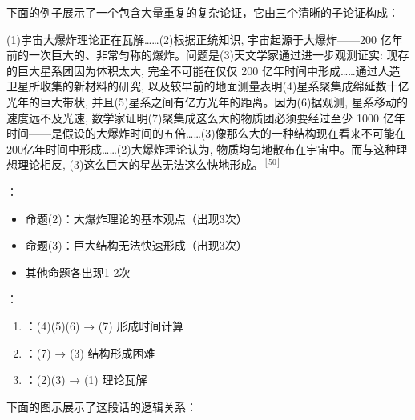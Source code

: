 下面的例子展示了一个包含大量重复的复杂论证，它由三个清晰的子论证构成：

\begin{displayquote}
(1)宇宙大爆炸理论正在瓦解……(2)根据正统知识, 宇宙起源于大爆炸——200 亿年前的一次巨大的、非常匀称的爆炸。问题是(3)天文学家通过进一步观测证实: 现存的巨大星系团因为体积太大, 完全不可能在仅仅 200 亿年时间中形成……通过人造卫星所收集的新材料的研究, 以及较早前的地面测量表明(4)星系聚集成绵延数十亿光年的巨大带状, 并且(5)星系之间有亿方光年的距离。因为(6)据观测, 星系移动的速度远不及光速, 数学家证明(7)聚集成这么大的物质团必须要经过至少 1000 亿年时间——是假设的大爆炸时间的五倍……(3)像那么大的一种结构现在看来不可能在 200亿年时间中形成……(2)大爆炸理论认为, 物质均匀地散布在宇宙中。而与这种理想理论相反, (3)这么巨大的星丛无法这么快地形成。$^{[50]}$
\end{displayquote}

\begin{examplebox}[title=大爆炸理论论证的结构分析]
：
\begin{itemize}
  \item 命题(2)：大爆炸理论的基本观点（出现3次）
  \item 命题(3)：巨大结构无法快速形成（出现3次）
  \item 其他命题各出现1-2次
\end{itemize}

：
\begin{enumerate}
  \item {}：(4)(5)(6) → (7) 形成时间计算
  \item {}：(7) → (3) 结构形成困难
  \item {}：(2)(3) → (1) 理论瓦解
\end{enumerate}
\end{examplebox}

下面的图示展示了这段话的逻辑关系：

